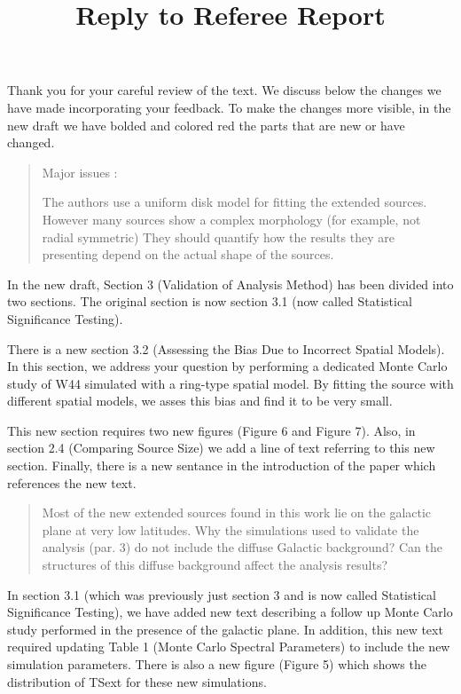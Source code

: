 \documentclass{article}
\title{Reply to Referee Report}
\newenvironment{referee}
{\begin{quote}\color{red}}
  {\end{quote}}
\newenvironment{reply}
  {}
  {}
\begin{document}
\maketitle

\begin{reply}
Thank you for your careful review of the text. We discuss below the
changes we have made incorporating your feedback. To make the changes more visible,
in the new draft we have bolded and colored red the parts that are new or have changed.
\end{reply}

\begin{referee}
Major issues :

The authors use a uniform disk model for fitting the extended sources.
However many sources show a complex morphology (for example, not radial symmetric)
They should quantify how the results they are presenting depend on the actual shape of the sources.
\end{referee}


\begin{reply}
In the new draft, Section 3 (Validation of Analysis Method) has been
divided into two sections. The original section is now section 3.1
(now called Statistical Significance Testing).

There is a new section 3.2 (Assessing the Bias Due to Incorrect
Spatial Models). In this section, we address your question by performing
a dedicated Monte Carlo study of W44 simulated with a ring-type spatial
model. By fitting the source with different spatial models, we asses
this bias and find it to be very small.

This new section requires two new figures (Figure 6 and Figure 7). Also,
in section 2.4 (Comparing Source Size) we add a line of text referring
to this new section. Finally, there is a new sentance in the introduction
of the paper which references the new text.
\end{reply}


\begin{referee}
Most of the new extended sources found in this work lie on the galactic
plane at very low latitudes. Why the simulations used to validate the
analysis (par. 3) do not include the diffuse Galactic background? Can
the structures of this diffuse background affect the analysis results?
\end{referee}

\begin{reply}
In section 3.1 (which was previously just section 3 and is now called
Statistical Significance Testing), we have added new text describing a
follow up Monte Carlo study performed in the presence of the galactic
plane. In addition, this new text required updating Table 1 (Monte Carlo
Spectral Parameters) to include the new simulation parameters. There is also
a new figure (Figure 5) which shows the distribution of TSext for these
new simulations.
\end{reply}
\end{document}
